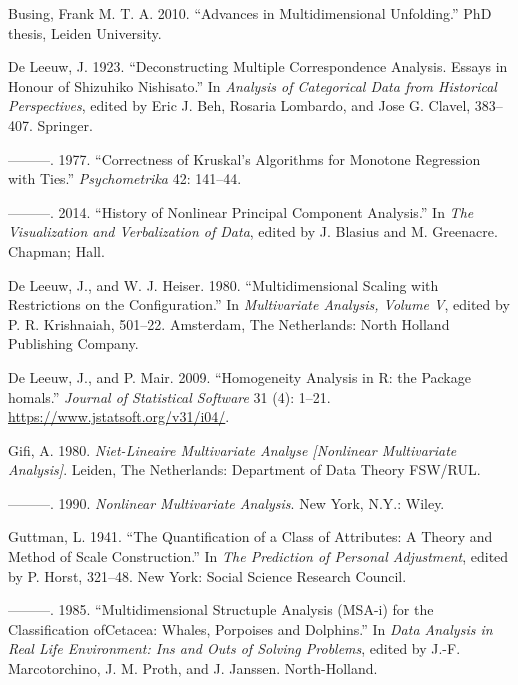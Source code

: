\documentclass[
  12pt,
]{article}
\newlength{\cslhangindent}
\newenvironment{CSLReferences}[2] %
 {\begin{list}{}{%
  \setlength{\itemindent}{0pt}
  \setlength{\leftmargin}{0pt}
  \setlength{\parsep}{0pt}
  \ifodd #1
   \setlength{\leftmargin}{\cslhangindent}
   \setlength{\itemindent}{-1\cslhangindent}
  \fi
  \setlength{\itemsep}{#2\baselineskip}}}
 {\end{list}}
\begin{document}
\label{refs}
\begin{CSLReferences}{1}{0}
Busing, Frank M. T. A. 2010. {``Advances in Multidimensional Unfolding.''} PhD thesis, Leiden University.

De Leeuw, J. 1923. {``Deconstructing Multiple Correspondence Analysis. Essays in Honour of Shizuhiko Nishisato.''} In \emph{Analysis of Categorical Data from Historical Perspectives}, edited by Eric J. Beh, Rosaria Lombardo, and Jose G. Clavel, 383--407. Springer.

---------. 1977. {``Correctness of Kruskal's Algorithms for Monotone Regression with Ties.''} \emph{Psychometrika} 42: 141--44.

---------. 2014. {``{History of Nonlinear Principal Component Analysis}.''} In \emph{{The Visualization and Verbalization of Data}}, edited by J. Blasius and M. Greenacre. Chapman; Hall.

De Leeuw, J., and W. J. Heiser. 1980. {``Multidimensional Scaling with Restrictions on the Configuration.''} In \emph{Multivariate Analysis, Volume {V}}, edited by P. R. Krishnaiah, 501--22. Amsterdam, The Netherlands: North Holland Publishing Company.

De Leeuw, J., and P. Mair. 2009. {``{Homogeneity Analysis in {R}: the Package homals}.''} \emph{Journal of Statistical Software} 31 (4): 1--21. \url{https://www.jstatsoft.org/v31/i04/}.

Gifi, A. 1980. \emph{Niet-Lineaire Multivariate Analyse {[}Nonlinear Multivariate Analysis{]}}. Leiden, The Netherlands: Department of Data Theory FSW/RUL.

---------. 1990. \emph{Nonlinear Multivariate Analysis}. New York, N.Y.: Wiley.

Guttman, L. 1941. {``{The Quantification of a Class of Attributes: A Theory and Method of Scale Construction}.''} In \emph{The Prediction of Personal Adjustment}, edited by P. Horst, 321--48. New York: Social Science Research Council.

---------. 1985. {``Multidimensional Structuple Analysis (MSA-i) for the Classification ofCetacea: Whales, Porpoises and Dolphins.''} In \emph{Data Analysis in Real Life Environment: Ins and Outs of Solving Problems}, edited by J.-F. Marcotorchino, J. M. Proth, and J. Janssen. North-Holland.


\end{CSLReferences}
\end{document}
